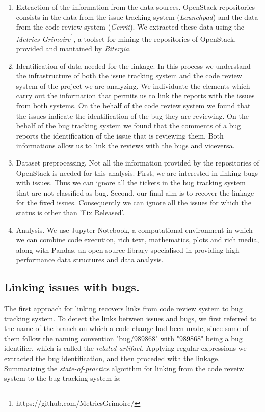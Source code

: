\documentclass{sig-alternate-05-2015}
\begin{document}
\begin{enumerate}
 \item Extraction of the information from the data sources. OpenStack repositories consists in the data from the 
 issue tracking system (\emph{Launchpad}) and the data from the code review system (\emph{Gerrit}). We extracted these
 data using the \emph{Metrics Grimoire}\footnote{https://github.com/MetricsGrimoire/}, 
 a toolset for mining the repositories of OpenStack, provided and mantained by \emph{Bitergia}.
 \item Identification of data needed for the linkage. In this process we understand the infrastructure of both the issue 
 tracking system and the code review system of the project we are analyzing. We individuate the elements which carry out 
 the information that permits us to link the reports with the issues from both systems. On the behalf of the code review 
 system we found that the issues indicate the identification of the bug they are reviewing. On the behalf of the bug 
 tracking system we found that the comments of a bug reports the identification of the issue that is reviewing them. 
 Both informations allow us to link the reviews with the bugs and viceversa.
 \item Dataset preprocessing. Not all the information provided by the repositories of OpenStack is needed for this 
 analysis. First, we are interested in linking bugs with issues. Thus we can ignore all the tickets in the bug tracking system 
 that are not classified as bug. Second, our final aim is to recover the linkage for the fixed issues. Consequently we can 
 ignore all the issues for which the status is other than 'Fix Released'.   
 \item Analysis. We use Jupyter Notebook, a computational environment in which we can combine code execution, rich text, 
 mathematics, plots and rich media, along with Pandas, an open source library specialised in providing high-performance 
 data structures and data analysis. 
\end{enumerate}

\subsection{Linking issues with bugs.}
The first approach for linking recovers links from code review system to bug tracking system. 
To detect the links between issues and bugs, we first referred to the name of the branch on which a code change had 
been made, since some of them follow the naming convention "bug/989868" with "989868" being a bug identifier, which 
is called the \emph{related artifact}. 
Applying regular expressions we extracted the bug identification, and then proceded with the linkage. Summarizing 
the \emph{state-of-practice} algorithm for linking from the code reveiw system to the bug tracking system is:
\end{document}
